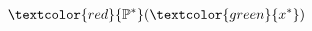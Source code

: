 \documentclass[preview]{standalone}
\begin{document}
\begin{align*}
\textcolor{red}{\mathbb{P}^*}(\textcolor{green}{x^*})
\end{align*}
\end{document}
